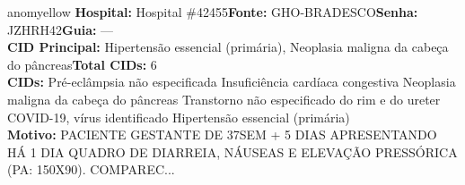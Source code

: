 \documentclass[a4paper,10pt]{article}
\begin{document}
\begin{anomalycard}[Interna\c{c}\~{a}o \#117943 | Pac. \#97875 | MODERADO (z=2.40) | LOS: 4d | 21/02/2026\,$\to$\,25/02/2026]{anomyellow}
\textbf{Hospital:} Hospital \#42455\quad \textbf{Fonte:} GHO-BRADESCO\quad \textbf{Senha:} JZHRH42\quad \textbf{Guia:} ---\\

\textbf{CID Principal:} {\small Hipertensão essencial (primária), Neoplasia maligna da cabeça do pâncreas}\quad\textbf{Total CIDs:} 6\\

\textbf{CIDs:} {\scriptsize Pré-eclâmpsia não especificada \textbar{} Insuficiência cardíaca congestiva \textbar{} Neoplasia maligna da cabeça do pâncreas \textbar{} Transtorno não especificado do rim e do ureter \textbar{} COVID-19, vírus identificado \textbar{} Hipertensão essencial (primária)}\\

\textbf{Motivo:} {\scriptsize PACIENTE GESTANTE DE 37SEM + 5 DIAS APRESENTANDO HÁ 1 DIA QUADRO DE DIARREIA, NÁUSEAS E ELEVAÇÃO PRESSÓRICA (PA: 150X90). COMPAREC...}\\




\end{anomalycard}
\end{document}

